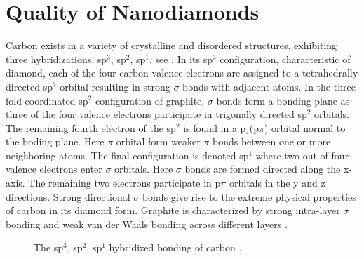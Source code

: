 
\chapter{Quality of Nanodiamonds}	\label{ch::crystal_quality}

		Carbon exists in a variety of crystalline and disordered structures, exhibiting three hybridizations, sp$^3$, sp$^2$, sp$^1$, see  . In its sp$^3$ configuration, characteristic of diamond, each of the four carbon valence electrons are assigned to a tetrahedrally directed sp$^3$ orbital resulting in strong $\sigma$ bonds with adjacent atoms.
		In the three-fold coordinated sp$^2$ configuration of graphite, $\sigma$ bonds form a bonding plane as three of the four valence electrons participate in trigonally directed sp$^2$ orbitals. The remaining fourth electron of the sp$^2$ is found in a p$_z$(p$\pi$) orbital normal to the boding plane. Here $\pi$ orbital form weaker $\pi$ bonds between one or more neighboring atoms.
		The final configuration is denoted sp$^1$ where two out of four valence electrons enter $\sigma$ orbitals. Here $\sigma$ bonds are formed directed along the x-axis. The remaining two electrons participate in p$\pi$ orbitals in the y and z directions.
		Strong directional $\sigma$ bonds give rise to the extreme physical properties of carbon in its diamond form. Graphite is characterized by strong intra-layer $\sigma$ bonding and weak van der Waals bonding across different layers \cite{Robertson2002}.

		\begin{figure}[htb]
			\centering
			\caption[Carbon hybridizations]{The sp$^3$, sp$^2$, sp$^1$ hybridized bonding of carbon \cite{Robertson1986}.}
			\label{fig::c_bonds}
		\end{figure}


